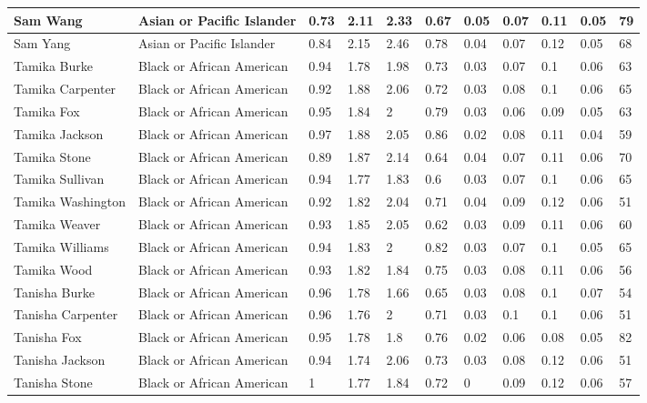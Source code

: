 \begin{table}[!ht]
\begin{tabular}{|l|l|l|l|l|l|l|l|l|l|l|}
        Sam Wang & Asian or Pacific Islander & 0.73 & 2.11 & 2.33 & 0.67 & 0.05 & 0.07 & 0.11 & 0.05 & 79 \\ \hline
        Sam Yang & Asian or Pacific Islander & 0.84 & 2.15 & 2.46 & 0.78 & 0.04 & 0.07 & 0.12 & 0.05 & 68 \\ \hline
        Tamika Burke & Black or African American & 0.94 & 1.78 & 1.98 & 0.73 & 0.03 & 0.07 & 0.1 & 0.06 & 63 \\ \hline
        Tamika Carpenter & Black or African American & 0.92 & 1.88 & 2.06 & 0.72 & 0.03 & 0.08 & 0.1 & 0.06 & 65 \\ \hline
        Tamika Fox & Black or African American & 0.95 & 1.84 & 2 & 0.79 & 0.03 & 0.06 & 0.09 & 0.05 & 63 \\ \hline
        Tamika Jackson & Black or African American & 0.97 & 1.88 & 2.05 & 0.86 & 0.02 & 0.08 & 0.11 & 0.04 & 59 \\ \hline
        Tamika Stone & Black or African American & 0.89 & 1.87 & 2.14 & 0.64 & 0.04 & 0.07 & 0.11 & 0.06 & 70 \\ \hline
        Tamika Sullivan & Black or African American & 0.94 & 1.77 & 1.83 & 0.6 & 0.03 & 0.07 & 0.1 & 0.06 & 65 \\ \hline
        Tamika Washington & Black or African American & 0.92 & 1.82 & 2.04 & 0.71 & 0.04 & 0.09 & 0.12 & 0.06 & 51 \\ \hline
        Tamika Weaver & Black or African American & 0.93 & 1.85 & 2.05 & 0.62 & 0.03 & 0.09 & 0.11 & 0.06 & 60 \\ \hline
        Tamika Williams & Black or African American & 0.94 & 1.83 & 2 & 0.82 & 0.03 & 0.07 & 0.1 & 0.05 & 65 \\ \hline
        Tamika Wood & Black or African American & 0.93 & 1.82 & 1.84 & 0.75 & 0.03 & 0.08 & 0.11 & 0.06 & 56 \\ \hline
        Tanisha Burke & Black or African American & 0.96 & 1.78 & 1.66 & 0.65 & 0.03 & 0.08 & 0.1 & 0.07 & 54 \\ \hline
        Tanisha Carpenter & Black or African American & 0.96 & 1.76 & 2 & 0.71 & 0.03 & 0.1 & 0.1 & 0.06 & 51 \\ \hline
        Tanisha Fox & Black or African American & 0.95 & 1.78 & 1.8 & 0.76 & 0.02 & 0.06 & 0.08 & 0.05 & 82 \\ \hline
        Tanisha Jackson & Black or African American & 0.94 & 1.74 & 2.06 & 0.73 & 0.03 & 0.08 & 0.12 & 0.06 & 51 \\ \hline
        Tanisha Stone & Black or African American & 1 & 1.77 & 1.84 & 0.72 & 0 & 0.09 & 0.12 & 0.06 & 57 \\ \hline

\end{tabular}
\end{table}

